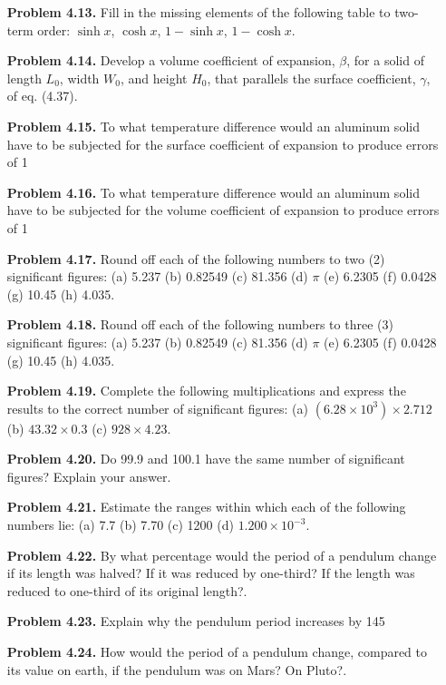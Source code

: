 \begin{enumerate}
    \item[\textbf{Problem 4.13.}] Fill in the missing elements of the following table to two-term order: $\sinh x$, $\cosh x$, $1-\sinh x$, $1-\cosh x$.
    \item[\textbf{Problem 4.14.}] Develop a volume coefficient of expansion, $\beta$, for a solid of length $L_0$, width $W_0$, and height $H_0$, that parallels the surface coefficient, $\gamma$, of eq. (4.37).
    \item[\textbf{Problem 4.15.}] To what temperature difference would an aluminum solid have to be subjected for the surface coefficient of expansion to produce errors of 1%
    \item[\textbf{Problem 4.16.}] To what temperature difference would an aluminum solid have to be subjected for the volume coefficient of expansion to produce errors of 1%
    \item[\textbf{Problem 4.17.}] Round off each of the following numbers to two (2) significant figures: (a) 5.237 (b) 0.82549 (c) 81.356 (d) $\pi$ (e) 6.2305 (f) 0.0428 (g) 10.45 (h) 4.035.
    \item[\textbf{Problem 4.18.}] Round off each of the following numbers to three (3) significant figures: (a) 5.237 (b) 0.82549 (c) 81.356 (d) $\pi$ (e) 6.2305 (f) 0.0428 (g) 10.45 (h) 4.035.
    \item[\textbf{Problem 4.19.}] Complete the following multiplications and express the results to the correct number of significant figures: (a) $(6.28 \times 10^3) \times 2.712$ (b) $43.32 \times 0.3$ (c) $928 \times 4.23$.
    \item[\textbf{Problem 4.20.}] Do 99.9 and 100.1 have the same number of significant figures? Explain your answer.
    \item[\textbf{Problem 4.21.}] Estimate the ranges within which each of the following numbers lie: (a) 7.7 (b) 7.70 (c) 1200 (d) $1.200 \times 10^{-3}$.
    \item[\textbf{Problem 4.22.}] By what percentage would the period of a pendulum change if its length was halved? If it was reduced by one-third? If the length was reduced to one-third of its original length?.
    \item[\textbf{Problem 4.23.}] Explain why the pendulum period increases by 145%
    \item[\textbf{Problem 4.24.}] How would the period of a pendulum change, compared to its value on earth, if the pendulum was on Mars? On Pluto?.

\end{enumerate}
